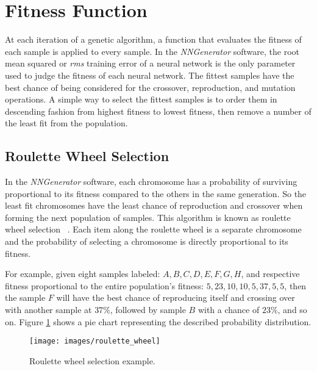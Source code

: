 \section{Fitness Function}
At each iteration of a genetic algorithm, a function that evaluates the fitness of each sample is applied to every sample.
In the {\it NNGenerator} software, the root mean squared or {\it rms}
training error of a neural network is the only parameter used to
judge the fitness of each neural network.
The fittest samples have the best chance of being considered for the crossover, reproduction, and mutation operations.
A simple way to select the fittest samples is to order them in descending fashion from highest fitness to lowest fitness, then remove a number of the least fit from the population.

\subsection{Roulette Wheel Selection}
In the {\it NNGenerator} software, each chromosome has a probability of surviving proportional to its fitness compared to the others in the same generation. 
So the least fit chromosomes have the least chance of reproduction and crossover when forming the next population of samples. 
This algorithm is known as roulette wheel selection ~\cite[237]{goldberg}.
Each item along the roulette wheel is a separate chromosome and the probability of selecting a chromosome is directly proportional to its fitness.

For example, given eight samples labeled: $A, B, C, D, E, F, G, H$, and respective fitness proportional to the entire population's fitness: 
$5, 23, 10, 10, 5, 37, 5, 5$, then the sample $F$ will have the best chance of reproducing itself and crossing over with another sample at $37\%$, followed by sample $B$ with a chance of $23\%$, and so on.
Figure \ref{roulette_wheel} shows a pie chart representing the described probability distribution.

\begin{figure}[htb!]
  \centering
  \texttt{[image: images/roulette\_wheel]}
  \caption{Roulette wheel selection example.}
  \label{roulette_wheel}
\end{figure}
